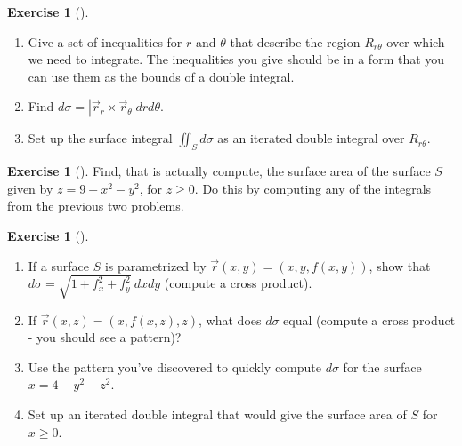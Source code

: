 \documentclass[10pt,]{book}
\theoremstyle{plain}
\theoremstyle{definition}
\theoremstyle{definition}
\theoremstyle{definition}
\theoremstyle{definition}
\newtheorem{exploration}[project]{Exercise}
\theoremstyle{definition}
\numberwithin{equation}{section}
\begin{document}
\begin{exploration}[]\label{exploration-278}
\leavevmode%
\begin{enumerate}[font=\bfseries,label=(\alph*),ref=\alph*]
\item\label{task-753} Give a set of inequalities for \(r\) and \(\theta\) that describe the region \(R_{r\theta}\) over which we need to integrate. The inequalities you give should be in a form that you can use them as the bounds of a double integral.%
\item\label{task-754} Find \(d\sigma = \left|\vec r_r\times \vec r_\theta \right|drd\theta\).%
\item\label{task-755} Set up the surface integral \(\iint_S d\sigma\) as an iterated double integral over \(R_{r\theta}\).%
\end{enumerate}
\end{exploration}
\begin{exploration}[]\label{exploration-279}
Find, that is actually compute, the surface area of the surface \(S\) given by \(z=9-x^2-y^2\), for \(z\geq 0\). Do this by computing any of the integrals from the previous two problems.%
\end{exploration}
\begin{exploration}[]\label{exploration-280}
\leavevmode%
\begin{enumerate}[font=\bfseries,label=(\alph*),ref=\alph*]
\item\label{task-756} If a surface \(S\) is parametrized by \(\vec r(x,y) = (x,y,f(x,y))\), show that \(d\sigma = \sqrt{1+f_x^2+f_y^2}\ dxdy\) (compute a cross product).%
\item\label{task-757} If \(\vec r(x,z) = (x,f(x,z),z)\), what does \(d\sigma\) equal (compute a cross product - you should see a pattern)?%
\item\label{task-758} Use the pattern you've discovered to quickly compute \(d\sigma\) for the surface \(x=4-y^2-z^2\).%
\item\label{task-759} Set up an iterated double integral that would give the surface area of \(S\) for \(x\geq 0\).%
\end{enumerate}
\end{exploration}
\end{document}
